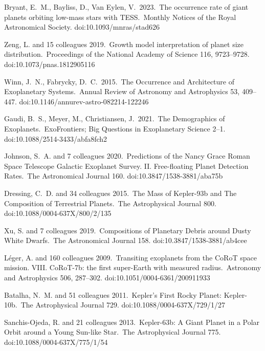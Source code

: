  Bryant, E.~M., Bayliss, D., Van Eylen, V.\ 2023.\ The occurrence rate of giant planets orbiting low-mass stars with TESS.\ Monthly Notices of the Royal Astronomical Society. doi:10.1093/mnras/stad626

 Zeng, L. and 15 colleagues 2019.\ Growth model interpretation of planet size distribution.\ Proceedings of the National Academy of Science 116, 9723–9728. doi:10.1073/pnas.1812905116

 Winn, J.~N., Fabrycky, D.~C.\ 2015.\ The Occurrence and Architecture of Exoplanetary Systems.\ Annual Review of Astronomy and Astrophysics 53, 409–447. doi:10.1146/annurev-astro-082214-122246


 Gaudi, B.~S., Meyer, M., Christiansen, J.\ 2021.\ The Demographics of Exoplanets.\ ExoFrontiers; Big Questions in Exoplanetary Science 2–1. doi:10.1088/2514-3433/abfa8fch2

 Johnson, S.~A. and 7 colleagues 2020.\ Predictions of the Nancy Grace Roman Space Telescope Galactic Exoplanet Survey. II. Free-floating Planet Detection Rates.\ The Astronomical Journal 160. doi:10.3847/1538-3881/aba75b

 Dressing, C.~D. and 34 colleagues 2015.\ The Mass of Kepler-93b and The Composition of Terrestrial Planets.\ The Astrophysical Journal 800. doi:10.1088/0004-637X/800/2/135

 Xu, S. and 7 colleagues 2019.\ Compositions of Planetary Debris around Dusty White Dwarfs.\ The Astronomical Journal 158. doi:10.3847/1538-3881/ab4cee

 L{\'e}ger, A. and 160 colleagues 2009.\ Transiting exoplanets from the CoRoT space mission. VIII. CoRoT-7b: the first super-Earth with measured radius.\ Astronomy and Astrophysics 506, 287–302. doi:10.1051/0004-6361/200911933

 Batalha, N.~M. and 51 colleagues 2011.\ Kepler's First Rocky Planet: Kepler-10b.\ The Astrophysical Journal 729. doi:10.1088/0004-637X/729/1/27


 Sanchis-Ojeda, R. and 21 colleagues 2013.\ Kepler-63b: A Giant Planet in a Polar Orbit around a Young Sun-like Star.\ The Astrophysical Journal 775. doi:10.1088/0004-637X/775/1/54

